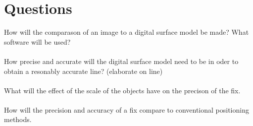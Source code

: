 

\section{Questions}
How will the comparason of an image to a digital surface model be made? What software will be used?

\paragraph{}
How precise and accurate will the digital surface model need to be in oder to obtain a resonably 
accurate line? (elaborate on line)

\paragraph{}
What will the effect of the scale of the objects have on the precison of the fix.

\paragraph{}
How will the precision and accuracy of a fix compare to conventional positioning methods.